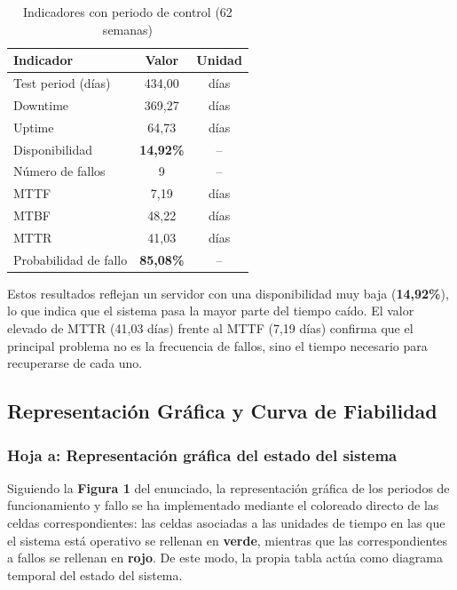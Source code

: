 \documentclass{article}
\newcommand{\bad}[1]{\textbf{\textcolor{metBad}{#1}}}
\begin{document}
\begin{table}[H]
    \centering
    \small
    \begin{tabular}{lcc}
        \toprule
        \textbf{Indicador}      & \textbf{Valor} & \textbf{Unidad} \\
        \midrule
        Test period (días)      & 434{,}00       & días            \\
        Downtime                & 369{,}27       & días            \\
        Uptime                  & 64{,}73        & días            \\
        Disponibilidad          & \bad{14{,}92\%}& --              \\
        Número de fallos        & 9              & --              \\
        MTTF                    & 7{,}19         & días            \\
        MTBF                    & 48{,}22        & días            \\
        MTTR                    & 41{,}03        & días            \\
        Probabilidad de fallo   & \bad{85{,}08\%}& --              \\
        \bottomrule
    \end{tabular}
    \caption{Indicadores con periodo de control (62 semanas)}
    \label{tab:indicadores_b}
\end{table}

Estos resultados reflejan un servidor con una disponibilidad muy baja (\bad{14{,}92\%}),
lo que indica que el sistema pasa la mayor parte del tiempo caído. El valor elevado de
MTTR (41{,}03 días) frente al MTTF (7{,}19 días) confirma que el principal problema
no es la frecuencia de fallos, sino el tiempo necesario para recuperarse de cada uno.

\subsection{Representación Gráfica y Curva de Fiabilidad}

\subsubsection{Hoja a: Representación gráfica del estado del sistema}

Siguiendo la \textbf{Figura 1} del enunciado, la representación gráfica de los periodos
de funcionamiento y fallo se ha implementado mediante el coloreado directo de las
celdas correspondientes: las celdas asociadas a las unidades de tiempo en las que el
sistema está operativo se rellenan en \textcolor{metGood}{\textbf{verde}}, mientras que
las correspondientes a fallos se rellenan en \textcolor{metBad}{\textbf{rojo}}. De este
modo, la propia tabla actúa como diagrama temporal del estado del sistema.
\end{document}
